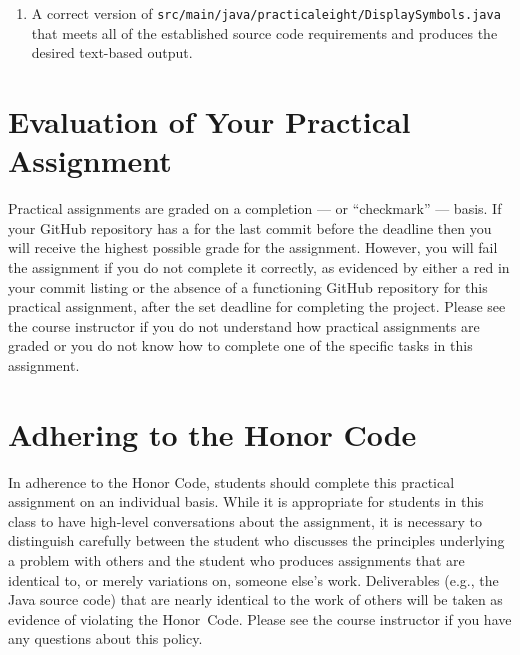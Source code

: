 \documentclass[11pt]{article}
\newcommand{\mainprogramsource}{\lstinline{src/main/java/practicaleight/DisplaySymbols.java}}
\newcommand{\checkmark}{\ding{51}}
\newcommand{\naughtmark}{\ding{55}}
\begin{document}
\begin{enumerate}

\setlength{\itemsep}{0in}

\item A correct version of \mainprogramsource{} that meets all of the established source code requirements and produces
  the desired text-based output.

\end{enumerate}

\section*{Evaluation of Your Practical Assignment}

Practical assignments are graded on a completion --- or ``checkmark'' --- basis. If your GitHub repository has a
\checkmark{} for the last commit before the deadline then you will receive the highest possible grade for the
assignment. However, you will fail the assignment if you do not complete it correctly, as evidenced by either a red
\naughtmark{} in your commit listing or the absence of a functioning GitHub repository for this practical assignment,
after the set deadline for completing the project. Please see the course instructor if you do not understand how
practical assignments are graded or you do not know how to complete one of the specific tasks in this assignment.

\section*{Adhering to the Honor Code}

In adherence to the Honor Code, students should complete this practical assignment on an individual basis. While it is
appropriate for students in this class to have high-level conversations about the assignment, it is necessary to
distinguish carefully between the student who discusses the principles underlying a problem with others and the student
who produces assignments that are identical to, or merely variations on, someone else's work. Deliverables (e.g., the
Java source code) that are nearly identical to the work of others will be taken as evidence of violating the \mbox{Honor
Code}. Please see the course instructor if you have any questions about this policy.
\end{document}
